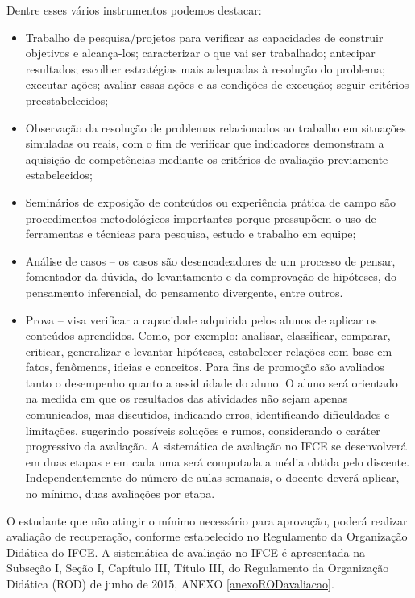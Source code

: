 Dentre esses vários instrumentos podemos destacar:
\begin{itemize}
	\item Trabalho de pesquisa/projetos para verificar as capacidades de construir objetivos e alcança-los; caracterizar o que vai ser trabalhado; antecipar resultados; escolher estratégias mais adequadas à resolução do problema; executar ações; avaliar essas ações e as condições de execução; seguir critérios preestabelecidos;
	\item Observação da resolução de problemas relacionados ao trabalho em situações simuladas ou reais, com o fim de verificar que indicadores demonstram a aquisição de competências mediante os critérios de avaliação previamente estabelecidos;
	\item Seminários de exposição de conteúdos ou experiência prática de campo são procedimentos metodológicos importantes porque pressupõem o uso de ferramentas e técnicas para pesquisa, estudo e trabalho em equipe;
	\item Análise de casos – os casos são desencadeadores de um processo de pensar, fomentador da dúvida, do levantamento e da comprovação de hipóteses, do pensamento inferencial, do pensamento divergente, entre outros.
	\item Prova – visa verificar a capacidade adquirida pelos alunos de aplicar os conteúdos aprendidos. Como, por exemplo: analisar, classificar, comparar, criticar, generalizar e levantar hipóteses, estabelecer relações com base em fatos, fenômenos, ideias e conceitos. Para fins de promoção são avaliados tanto o desempenho quanto a assiduidade do aluno. O aluno será orientado na medida em que os resultados das atividades não sejam apenas comunicados, mas discutidos, indicando erros, identificando dificuldades e limitações, sugerindo possíveis soluções e rumos, considerando o caráter progressivo da avaliação.
	A sistemática de avaliação no IFCE se desenvolverá em duas etapas e em cada uma será computada a média obtida pelo discente. Independentemente do número de aulas semanais, o docente deverá aplicar, no mínimo, duas avaliações por etapa. 
\end{itemize}

O estudante que não atingir o mínimo necessário para aprovação, poderá realizar avaliação de recuperação, conforme estabelecido no Regulamento da Organização Didática do IFCE. A sistemática de avaliação no IFCE é apresentada na Subseção I, Seção I, Capítulo III, Título III, do Regulamento da Organização Didática (ROD) de junho de 2015, ANEXO \ref{anexoRODavaliacao}.
